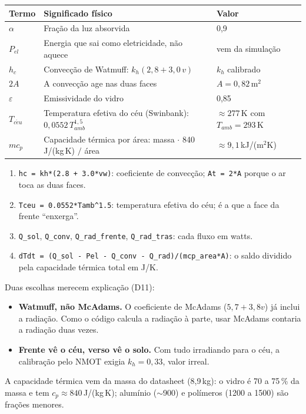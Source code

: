 \begin{center}\small
\begin{tabular}{@{}lll@{}}
\toprule
Termo & Significado f\'isico & Valor \\ \midrule
$\alpha$ & Fra\c{c}\~ao da luz absorvida & 0,9 \\
$P_{el}$ & Energia que sai como eletricidade, n\~ao aquece & vem da simula\c{c}\~ao \\
$h_c$ & Convec\c{c}\~ao de Watmuff: $k_h(2{,}8+3{,}0\,v)$ & $k_h$ calibrado \\
$2A$ & A convec\c{c}\~ao age nas duas faces & $A=0{,}82$\,m$^2$ \\
$\varepsilon$ & Emissividade do vidro & 0,85 \\
$T_{c\acute eu}$ & Temperatura efetiva do c\'eu (Swinbank): $0{,}0552\,T_{amb}^{1{,}5}$ & $\approx277$\,K com $T_{amb}=293$\,K \\
$m c_p$ & Capacidade t\'ermica por \'area: massa $\cdot$ 840\,J/(kg\,K) $/$ \'area & $\approx9{,}1$\,kJ/(m$^2$K) \\
\bottomrule
\end{tabular}
\end{center}


\begin{logica}
\begin{enumerate}
\item \texttt{hc = kh*(2.8 + 3.0*vw)}: coeficiente de convec\c{c}\~ao; \texttt{At = 2*A} porque o ar toca as duas faces.
\item \texttt{Tceu = 0.0552*Tamb\^{}1.5}: temperatura efetiva do c\'eu; \'e a que a face da frente ``enxerga''.
\item \texttt{Q\_sol}, \texttt{Q\_conv}, \texttt{Q\_rad\_frente}, \texttt{Q\_rad\_tras}: cada fluxo em watts.
\item \texttt{dTdt = (Q\_sol - Pel - Q\_conv - Q\_rad)/(mcp\_area*A)}: o saldo dividido pela capacidade t\'ermica total em J/K.
\end{enumerate}
\end{logica}

Duas escolhas merecem explica\c{c}\~ao (D11):
\begin{itemize}
\item \textbf{Watmuff, n\~ao McAdams.} O coeficiente de McAdams ($5{,}7+3{,}8v$) j\'a inclui a
 radia\c{c}\~ao. Como o c\'odigo calcula a radia\c{c}\~ao \`a parte, usar McAdams contaria a radia\c{c}\~ao duas vezes.
\item \textbf{Frente v\^e o c\'eu, verso v\^e o solo.} Com tudo irradiando para o c\'eu, a calibra\c{c}\~ao
 pelo NMOT exigia $k_h=0{,}33$, valor irreal.
\end{itemize}
A capacidade t\'ermica vem da massa do datasheet (8,9\,kg): o vidro \'e 70 a 75\,\% da massa e tem
$c_p\approx840$\,J/(kg\,K); alum\'inio ($\sim$900) e pol\'imeros (1200 a 1500) s\~ao fra\c{c}\~oes menores.

